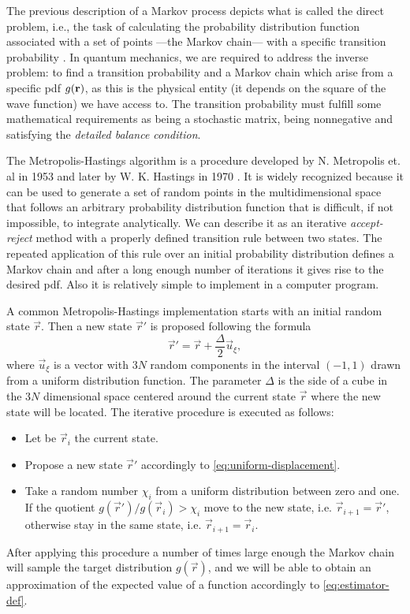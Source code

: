The previous description of a Markov process depicts what is called {the direct
problem}, i.e., the task of calculating the probability distribution function
associated with a set of points ---the Markov chain--- with a specific
transition probability \cite{bib:guardiola.1998}. In quantum mechanics, we are
required to address the inverse problem: to find a transition probability and a
Markov chain which arise from a specific pdf $g(\mathbf{r})$, as this is the physical
entity (it depends on the square of the wave function) we have access to. The
transition probability must fulfill some mathematical requirements as being a
stochastic matrix, being nonnegative and satisfying the \textit{detailed balance
condition}.

The Metropolis-Hastings algorithm is a procedure developed by N. Metropolis et.
al in 1953 \cite{bib:metropolis-j-chem-phys.21.1087.1953} and later by W. K.
Hastings in 1970 \cite{bib:hastings-biometrika.57.97.1970}. It is widely
recognized because it can be used to generate a set of random points in the
multidimensional space that follows an arbitrary probability distribution
function that is difficult, if not impossible, to integrate analytically. We can
describe it as an iterative \textit{accept-reject} method with a properly
defined transition rule between two states. The repeated application of this
rule over an initial probability distribution defines a Markov chain and after a
long enough number of iterations it gives rise to the desired pdf. Also it is
relatively simple to implement in a computer program.

A common Metropolis-Hastings implementation starts with an initial random state
$\vec r$. Then a new state $\vec r'$ is proposed following the formula
%
\begin{equation}
	\label{eq:uniform-displacement}
	\vec r' = \vec r + \frac{\Delta}{2} \vec u_{\xi},
\end{equation}
%
where $\vec u_\xi$ is a vector with $3N$ random components in the interval $(-1,
1)$ drawn from a uniform distribution function. The parameter $\Delta$ is the
side of a cube in the $3N$ dimensional space centered around the current state
$\vec r$ where the new state will be located. The iterative procedure is
executed as follows:
%
\begin{itemize}
	\item Let be $\vec r_i$ the current state.

	\item Propose a new state $\vec r'$ accordingly to
	\eqref{eq:uniform-displacement}.

	\item Take a random number $\chi_i$ from a uniform distribution between zero
	and one. If the quotient $g(\vec r') / g(\vec r_i) > \chi_i$ move to the new
	state, i.e. $\vec r_{i+1} = \vec r'$, otherwise stay in the same state, i.e.
	$\vec r_{i+1} = \vec r_i$.

\end{itemize}
%
After applying this procedure a number of times large enough the Markov chain
will sample the target distribution $g(\vec r)$, and we will be able to obtain
an approximation of the expected value of a function accordingly to
\eqref{eq:estimator-def}.

